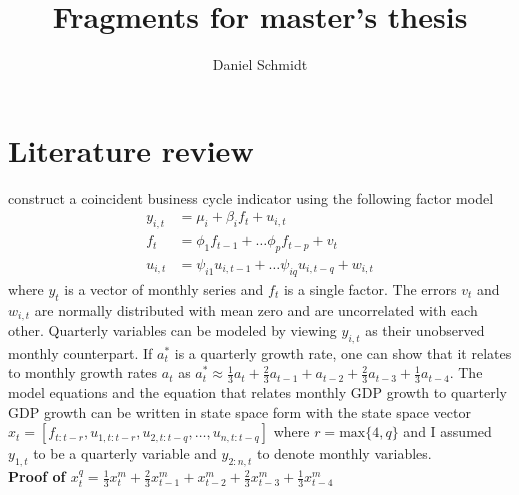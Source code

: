 \documentclass[12pt,a4paper]{scrartcl}
\title{Fragments for master's thesis}
\author{Daniel Schmidt}
\begin{document}
	
\maketitle

\section{Literature review}

\textbf{\citet{MarianoMurasawa2003}} construct a coincident business cycle indicator using the following factor model
\begin{align}
y_{i,t} &= \mu_i + \beta_i f_t + u_{i,t} \\
f_t &= \phi_1 f_{t-1} + \dots \phi_p f_{t-p} + v_t \\
u_{i,t} &= \psi_{i1} u_{i,t-1} + \dots \psi_{iq} u_{i,t-q} + w_{i,t}
\end{align}
where $y_t$ is a vector of monthly series and $f_t$ is a single factor. The errors $v_{t}$ and $w_{i,t}$ are normally distributed with mean zero and are uncorrelated with each other. Quarterly variables can be modeled by viewing $y_{i,t}$ as their unobserved monthly counterpart. If $a^*_t$ is a quarterly growth rate, one can show that it relates to monthly growth rates $a_t$ as $a^*_t \approx \frac{1}{3}a_t + \frac{2}{3}a_{t-1} + a_{t-2} + \frac{2}{3}a_{t-3} + \frac{1}{3}a_{t-4}$. The model equations and the equation that relates monthly GDP growth to quarterly GDP growth can be written in state space form with the state space vector $x_t=[f_{t:t-r}, u_{1,t:t-r}, u_{2,t:t-q}, \dots, u_{n,t:t-q}]$ where $r = \mathrm{max}\{4, q\}$ and I assumed $y_{1,t}$ to be a quarterly variable and $y_{2:n,t}$ to denote monthly variables.\\

\textbf{Proof of $x_t^q = \frac{1}{3} x_t^m + \frac{2}{3} x_{t-1}^m + x_{t-2}^m + \frac{2}{3} x_{t-3}^m + \frac{1}{3} x_{t-4}^m$}
\end{document}
